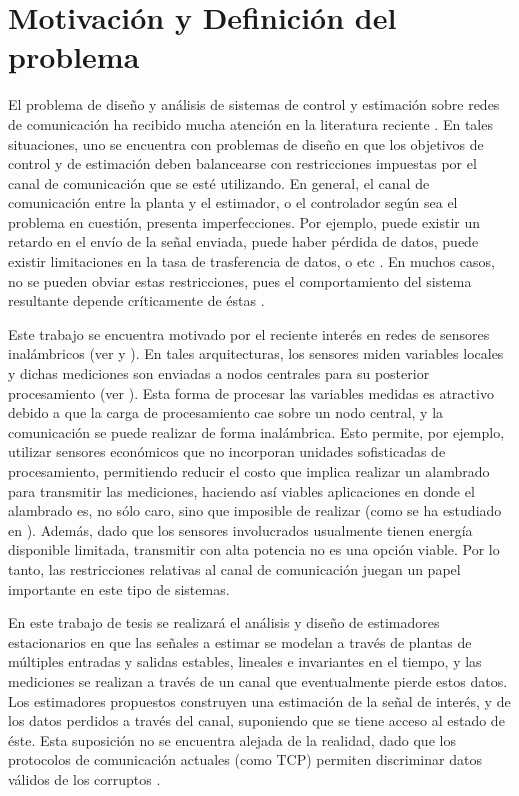 \section{Motivaci\'on y Definici\'on del problema} 
El problema de dise\~no y an\'alisis de sistemas de control y estimaci\'on sobre redes de comunicaci\'on ha recibido mucha atenci\'on en la literatura reciente \cite{antbai07}. En tales situaciones, uno se encuentra con problemas de dise\~no en que los objetivos de control y de estimaci\'on deben balancearse con restricciones impuestas por el canal de comunicaci\'on que se est\'e utilizando. En  general, el canal de comunicaci\'on entre la planta y el estimador, o el controlador seg\'un sea el problema en cuesti\'on, presenta imperfecciones. Por ejemplo, puede existir un retardo en el env\'io de la se\~nal enviada, puede haber p\'erdida de datos, puede existir limitaciones en la tasa de trasferencia de datos, o etc \cite{wong1997systems,li1996state,malyavej2005problem}. En muchos casos, no se pueden obviar estas restricciones, pues el comportamiento del sistema resultante depende cr\'iticamente de \'estas \cite{tatikonda2004control}.

Este trabajo se encuentra motivado por el reciente inter\'es en redes de sensores inal\'ambricos (ver \cite{ghakum03} y \cite{ilmake04}). En tales arquitecturas, los sensores miden variables locales y dichas mediciones son enviadas a nodos centrales para su posterior procesamiento (ver \cite{chokum03}). Esta forma de procesar las variables medidas es atractivo debido a que la carga de procesamiento cae sobre un nodo central, y la comunicaci\'on se puede realizar de forma inal\'ambrica. Esto permite, por ejemplo, utilizar sensores econ\'omicos que no incorporan unidades sofisticadas de procesamiento, permitiendo reducir el costo que implica realizar un alambrado para transmitir las mediciones, haciendo as\'i viables aplicaciones en donde el alambrado es, no s\'olo caro, sino que imposible de realizar (como se ha estudiado en \cite{wacosi07}). Adem\'as, dado que los sensores involucrados usualmente tienen energ\'ia disponible limitada, transmitir con alta potencia no es una opci\'on viable. Por lo tanto, las restricciones relativas al canal de comunicaci\'on juegan un papel importante en este tipo de sistemas.

En este trabajo de tesis se realizar\'a el an\'alisis y dise\~no de estimadores estacionarios en que las se\~nales a estimar se modelan a trav\'es de plantas  de m\'ultiples entradas y salidas estables, lineales e invariantes en el tiempo, y las mediciones se realizan a trav\'es de un canal que eventualmente pierde estos datos. Los estimadores propuestos construyen una estimaci\'on de la se\~nal de inter\'es, y de los datos perdidos a trav\'es del canal, suponiendo que se tiene acceso al estado de \'este. Esta suposici\'on no se encuentra alejada de la realidad, dado que los protocolos de comunicaci\'on actuales (como TCP) permiten discriminar datos v\'alidos de los corruptos \cite{scsifr07,garone2007lqg}.

